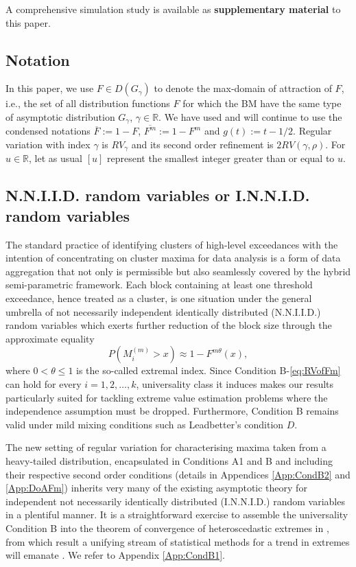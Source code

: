 \documentclass[11pt, a4paper, oneside]{article}
\numberwithin{equation}{section}
\theoremstyle{plain}
\theoremstyle{definition}
\newcommand{\field}[1]{\mathbb{#1}}
\newcommand{\real}{\ensuremath{{\field{R}}}}
\begin{document}
A comprehensive simulation study is available as \textbf{supplementary material} to this paper.


\subsection{Notation}

In this paper, we use $F\in D(G_{\gamma})$ to denote the max-domain of attraction of $F$, i.e., the set of all distribution functions $F$ for which the BM have the same type of asymptotic distribution $G_{\gamma}$, $\gamma \in \real$. We have used and will continue to use the condensed notations $\overline{F}:= 1-{F}$,  $\overline{F^{m}}:= 1-{F}^{m}$ and $g(t):= t-1/2$. 
Regular variation with index $\gamma$ is $RV_\gamma$ and its second order refinement is $2RV(\gamma, \rho)$. For $u \in \real$, let as usual $[u]$ represent the smallest integer greater than or equal to $u$. %



\subsection{N.N.I.I.D. random variables or I.N.N.I.D. random variables}\label{Sec:ennes}

The standard practice of identifying clusters of high-level exceedances with the intention of concentrating on cluster maxima for data analysis is a form of data aggregation that not only is permissible but also seamlessly covered by the hybrid semi-parametric framework. Each block containing at least one threshold exceedance, hence treated as a cluster, is one situation under the general umbrella of not necessarily independent identically distributed (N.N.I.I.D.) random variables which exerts further reduction of the block size through the approximate equality
\begin{equation*}
	P(M_i^{(m)} > x) \approx 1- F^{m\theta}(x),
\end{equation*}
where $0 < \theta \leq 1$ is the so-called extremal index. Since Condition B-\eqref{eq:RVofFm} can hold for every $i =1, 2, \ldots, k$, universality class it induces makes our results particularly suited for tackling extreme value estimation problems where the independence assumption must be dropped.
Furthermore, Condition B remains valid under mild mixing conditions such as Leadbetter's condition $D$.

The new setting of regular variation for characterising maxima taken from a heavy-tailed distribution, encapsulated in Conditions A1 and B and including their respective second order conditions (details in Appendices \ref{App:CondB2} and \ref{App:DoAFm}) inherits very many of the existing asymptotic theory for independent not necessarily identically distributed (I.N.N.I.D.) random variables in a plentiful manner. It is a straightforward exercise to assemble the universality Condition B into the theorem of convergence of heteroscedastic extremes in \citet{deHaan2015}, from which result a unifying stream of statistical methods for a trend in extremes will emanate \citep[see e.g.][]{TailTrend15,SpaceTimeTrend22}. We refer to Appendix \ref{App:CondB1}.
\end{document}
